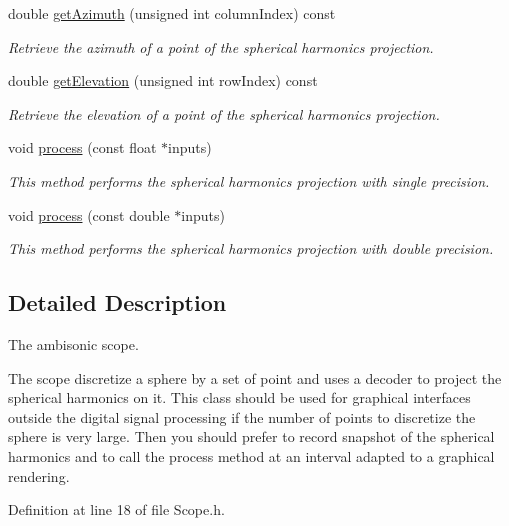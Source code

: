\begin{DoxyCompactItemize}
double \hyperlink{class_hoa3_d_1_1_scope_a9a0c8cf80dc5686b746fc3d5b742de45}{get\-Azimuth} (unsigned int column\-Index) const 
\begin{DoxyCompactList}\small\item\em Retrieve the azimuth of a point of the spherical harmonics projection. \end{DoxyCompactList}\item 
double \hyperlink{class_hoa3_d_1_1_scope_ab878f89077b6d2829bf00436aadd309b}{get\-Elevation} (unsigned int row\-Index) const 
\begin{DoxyCompactList}\small\item\em Retrieve the elevation of a point of the spherical harmonics projection. \end{DoxyCompactList}\item 
void \hyperlink{class_hoa3_d_1_1_scope_a4e9866933d1b863860ffd64b0514a6e6}{process} (const float $\ast$inputs)
\begin{DoxyCompactList}\small\item\em This method performs the spherical harmonics projection with single precision. \end{DoxyCompactList}\item 
void \hyperlink{class_hoa3_d_1_1_scope_ae9a788e0352011e3ad7ad5f88b5b12ed}{process} (const double $\ast$inputs)
\begin{DoxyCompactList}\small\item\em This method performs the spherical harmonics projection with double precision. \end{DoxyCompactList}\end{DoxyCompactItemize}


\subsection{Detailed Description}
The ambisonic scope. 

The scope discretize a sphere by a set of point and uses a decoder to project the spherical harmonics on it. This class should be used for graphical interfaces outside the digital signal processing if the number of points to discretize the sphere is very large. Then you should prefer to record snapshot of the spherical harmonics and to call the process method at an interval adapted to a graphical rendering. 

Definition at line 18 of file Scope.\-h.



